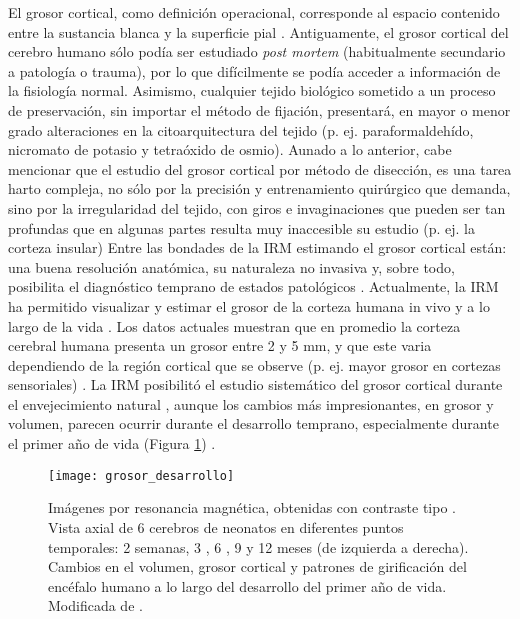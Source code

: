 El grosor cortical, como definición operacional, corresponde al espacio contenido entre la sustancia
blanca y la superficie pial \cite{Lerch_Evans_2005}. Antiguamente, el grosor cortical del cerebro humano sólo
podía ser estudiado \emph{post mortem} (habitualmente secundario a patología o trauma), por lo que
difícilmente se podía acceder a información de la fisiología normal. Asimismo, cualquier tejido
biológico sometido a un proceso de preservación, sin importar el método de fijación, presentará, en
mayor o menor grado alteraciones en la citoarquitectura del tejido (p. ej. paraformaldehído, nicromato
de potasio y tetraóxido de osmio). Aunado a lo anterior, cabe mencionar que el estudio del grosor
cortical por método de disección, es una tarea harto compleja, no sólo por la precisión y entrenamiento
quirúrgico que demanda, sino por la irregularidad del tejido, con giros e invaginaciones que pueden ser
tan profundas que en algunas partes resulta muy inaccesible su estudio (p. ej. la corteza insular)
Entre las bondades de la IRM estimando el grosor cortical están: una buena resolución anatómica, su naturaleza no invasiva y, sobre todo, posibilita el diagnóstico temprano de estados patológicos \cite{Dickerson2001,Kaye1997,Rosas2002}. Actualmente, la IRM ha permitido visualizar y
estimar el grosor de la corteza humana in vivo y a lo largo de la vida \cite{Salat1999a,Sowell2003}.
Los datos actuales muestran que en promedio la corteza cerebral humana presenta un grosor entre 2 y 5
mm, y que este varia dependiendo de la región cortical que se observe (p. ej. mayor grosor en cortezas
sensoriales) \cite{Fischl_Dale_2000,Shipp_2007}. La IRM posibilitó el estudio sistemático
del grosor cortical durante el envejecimiento natural \cite{Jack_1997,Sowell2003}, aunque los cambios
más impresionantes, en grosor y volumen, parecen ocurrir durante el desarrollo temprano,
especialmente durante el primer año de vida (Figura \ref{fig:grosor_desarrollo}) \cite{Nie2012}.


\begin{figure}[htb]
\begin{figg}
   \texttt{[image: grosor\_desarrollo]}
   \caption{Imágenes por resonancia magnética, obtenidas con contraste tipo \Tone. Vista axial de 6 cerebros de neonatos en diferentes puntos temporales: 2 semanas, 3 , 6 , 9 y 12 meses (de izquierda a derecha). Cambios en el volumen, grosor cortical y patrones de girificación del encéfalo humano a lo largo del desarrollo del primer año de vida. Modificada de \cite{Nie2012}.
}
 \label{fig:grosor_desarrollo}
 \end{figg}
\end{figure}


